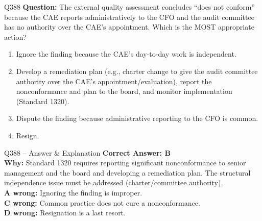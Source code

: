 \documentclass[aspectratio=169,10pt]{beamer}
\begin{document}
	\begin{frame}[t]{Q388}
		\small
		\textbf{Question:} The external quality assessment concludes ``does not conform'' because the CAE reports administratively to the CFO and the audit committee has no authority over the CAE's appointment. Which is the MOST appropriate action?
		\begin{enumerate}[label=\Alph*.,itemsep=1pt,topsep=2pt]
			\item Ignore the finding because the CAE's day-to-day work is independent.
			\item Develop a remediation plan (e.g., charter change to give the audit committee authority over the CAE's appointment/evaluation), report the nonconformance and plan to the board, and monitor implementation (Standard 1320).
			\item Dispute the finding because administrative reporting to the CFO is common.
			\item Resign.
		\end{enumerate}
	\end{frame}
	
	\begin{frame}[t]{Q388 -- Answer \& Explanation}
		\small
		\textbf{Correct Answer: B} \\[4pt]
		\textbf{Why:} Standard 1320 requires reporting significant nonconformance to senior management and the board and developing a remediation plan. The structural independence issue must be addressed (charter/committee authority). \\[4pt]
		\textbf{A wrong:} Ignoring the finding is improper. \\[2pt]
		\textbf{C wrong:} Common practice does not cure a nonconformance. \\[2pt]
		\textbf{D wrong:} Resignation is a last resort.
	\end{frame}
	
\end{document}
